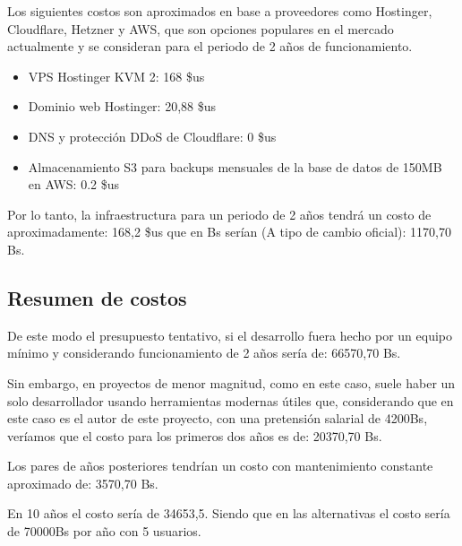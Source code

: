Los siguientes costos son aproximados en base a proveedores como Hostinger, Cloudflare, Hetzner y AWS, que son opciones populares en el mercado actualmente y se consideran para el periodo de 2 años de funcionamiento.

\begin{itemize}
  \item VPS Hostinger KVM 2: 168 \$us
  \item Dominio web Hostinger: 20,88 \$us
  \item DNS y protección DDoS de Cloudflare: 0 \$us
  \item Almacenamiento S3 para backups mensuales de la base de datos de 150MB en AWS: 0.2 \$us
\end{itemize}

Por lo tanto, la infraestructura para un periodo de 2 años tendrá un costo de aproximadamente: 168,2 \$us que en Bs serían (A tipo de cambio oficial): 1170,70 Bs.

\subsection{Resumen de costos}

De este modo el presupuesto tentativo, si el desarrollo fuera hecho por un equipo mínimo y considerando funcionamiento de 2 años sería de: 66570,70 Bs.


Sin embargo, en proyectos de menor magnitud, como en este caso, suele haber un solo desarrollador usando herramientas modernas útiles que, considerando que en este caso es el autor de este proyecto, con una pretensión salarial de 4200Bs, veríamos que el costo para los primeros dos años es de: 20370,70 Bs.

Los pares de años posteriores tendrían un costo con mantenimiento constante aproximado de: 3570,70 Bs.

En 10 años el costo sería de 34653,5. Siendo que en las alternativas el costo sería de 70000Bs por año con 5 usuarios.